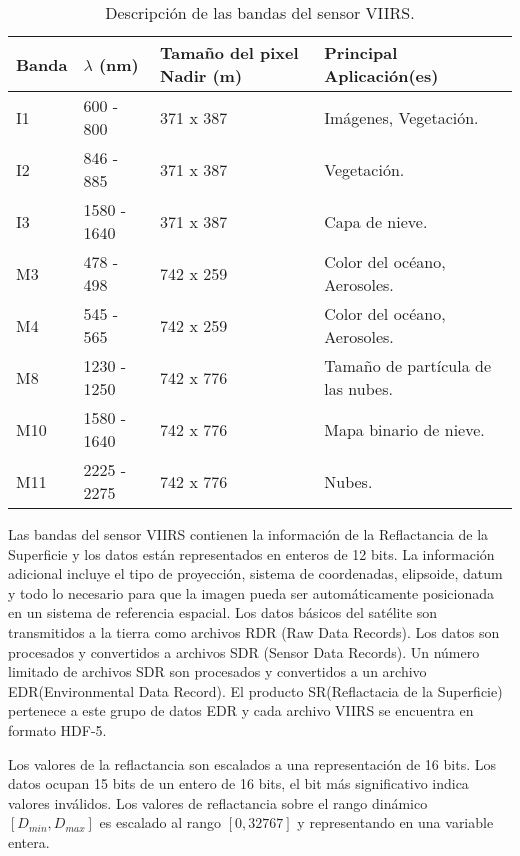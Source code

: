 \begin{table}[ht!]

\begin{center}
\begin{tabular}{| p{2cm} | p{2cm} | p{2cm} | p{5cm} |}
\hline
Banda & $\lambda$ (nm) & Tamaño del pixel Nadir (m) & Principal Aplicación(es)\\
\hline
I1 & 600 - 800 & 371 x 387 & Imágenes, Vegetación.\\
\hline
I2 & 846 - 885 & 371 x 387 & Vegetación.\\
\hline 
I3 & 1580 - 1640 & 371 x 387 & Capa de nieve.\\
\hline
M3 & 478 - 498 & 742 x 259 & Color del océano, Aerosoles.\\
\hline
M4 & 545 - 565 & 742 x 259 & Color del océano, Aerosoles.\\
\hline
M8 & 1230 - 1250 & 742 x 776 & Tamaño de partícula de las nubes.\\
\hline
M10 & 1580 - 1640 & 742 x 776 & Mapa binario de nieve.\\
\hline
M11 & 2225 - 2275 & 742 x 776 & Nubes.\\
\hline
\end{tabular}
\end{center} 	
\caption{Descripción de las bandas del sensor VIIRS.} \label{channel_decription}

\end{table}

Las bandas del sensor VIIRS contienen la información de la Reflactancia de la Superficie y los datos están representados en enteros de 12 bits. La información adicional incluye el tipo de proyección, sistema de coordenadas, elipsoide, datum y todo lo necesario para que la imagen pueda ser automáticamente posicionada en un sistema de referencia espacial. Los datos básicos del satélite son transmitidos a la tierra como archivos RDR (Raw Data Records). Los datos son procesados y convertidos a archivos SDR (Sensor Data Records). Un número limitado de archivos SDR son procesados y convertidos a un archivo EDR(Environmental Data Record). El producto SR(Reflactacia de la Superficie) pertenece a este grupo de datos EDR y cada archivo VIIRS se encuentra en formato HDF-5. 

Los valores de la reflactancia son escalados a una representación de 16 bits. Los datos ocupan 15 bits de un entero de 16 bits, el bit más significativo indica valores inválidos. Los valores de reflactancia sobre el rango dinámico $[D_{min}, D_{max}]$ es escalado al rango $[0, 32767]$ y representando en una variable entera. 


